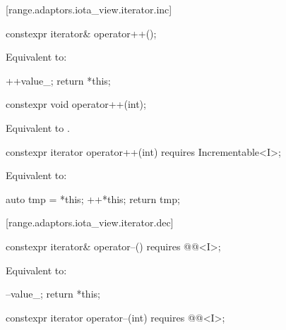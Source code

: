 [range.adaptors.iota_view.iterator.inc]{}

\begin{itemdecl}
constexpr iterator& operator++();
\end{itemdecl}

\begin{itemdescr}
\pnum
\effects Equivalent to:
\begin{codeblock}
++value_;
return *this;
\end{codeblock}
\end{itemdescr}

\begin{itemdecl}
constexpr void operator++(int);
\end{itemdecl}

\begin{itemdescr}
\pnum
\effects Equivalent to .
\end{itemdescr}

\begin{itemdecl}
constexpr iterator operator++(int) requires Incrementable<I>;
\end{itemdecl}

\begin{itemdescr}
\pnum
\effects Equivalent to:
\begin{codeblock}
auto tmp = *this;
++*this;
return tmp;
\end{codeblock}
\end{itemdescr}

[range.adaptors.iota_view.iterator.dec]{}

\begin{itemdecl}
constexpr iterator& operator--() requires @@<I>;
\end{itemdecl}

\begin{itemdescr}
\pnum
\effects Equivalent to:
\begin{codeblock}
--value_;
return *this;
\end{codeblock}
\end{itemdescr}

\begin{itemdecl}
constexpr iterator operator--(int) requires @@<I>;
\end{itemdecl}

